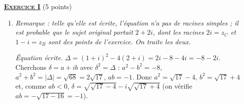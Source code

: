 \providecommand{\Plan}{(\mathscr{P})}
\providecommand{\Ouv}{(O ; \vec{u} , \vec{v})}
\providecommand{\Courbe}{(\mathscr{C})}
\providecommand{\cm}{~\mathrm{cm}}
\providecommand{\dx}{~\mathrm{d}x}
%
\noindent \underline{\textsc{\textbf{Exercice I}}} (5 points)
\begin{enumerate}
   \item {}
      \emph{Remarque : telle qu'elle est \'ecrite, l'\'equation n'a pas de racines simples ; il est probable que le sujet
      original portait $2 + 2i$, dont les racines $2i = z_C$ et $1 - i = z_B$ sont des points de l'exercice. On traite
      les deux.}

      \emph{\'Equation \'ecrite.} $\Delta = (1+i)^2 - 4(2 + i) = 2i - 8 - 4i = -8 - 2i$.
      Cherchons $\delta = a + ib$ avec $\delta^2 = \Delta$ : $a^2 - b^2 = -8$, $a^2 + b^2 = |\Delta| = \sqrt{68} = 2\sqrt{17}$, $ab = -1$.
      Donc $a^2 = \sqrt{17} - 4$, $b^2 = \sqrt{17} + 4$ et, comme $ab < 0$,
      $\delta = \sqrt{\sqrt{17} - 4} - i\sqrt{\sqrt{17} + 4}$ (on v\'erifie $ab = -\sqrt{17 - 16} = -1$).
      \par\noindent{}


\end{enumerate}
